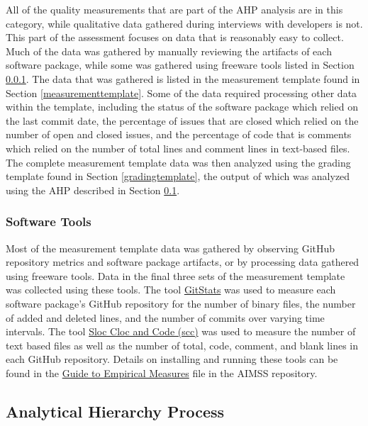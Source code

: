 \documentclass[12pt, notitlepage]{article}
\begin{document}
All of the quality measurements that are part of the AHP analysis are in this category, while qualitative data gathered during interviews with developers is not. This part of the assessment focuses on data that is reasonably easy to collect. Much of the data was gathered by manually reviewing the artifacts of each software package, while some was gathered using freeware tools listed in Section \ref{tools}. The data that was gathered is listed in the measurement template found in Section \ref{measurementtemplate}. Some of the data required processing other data within the template, including the status of the software package which relied on the last commit date, the percentage of issues that are closed which relied on the number of open and closed issues, and the percentage of code that is comments which relied on the number of total lines and comment lines in text-based files. The complete measurement template data was then analyzed using the grading template found in Section \ref{gradingtemplate}, the output of which was analyzed using the AHP described in Section \ref{AHP}.

\subsubsection{Software Tools}\label{tools}

Most of the measurement template data was gathered by observing GitHub repository metrics and software package artifacts, or by processing data gathered using freeware tools. Data in the final three sets of the measurement template was collected using these tools. The tool \href{https://github.com/tomgi/git_stats}{GitStats} was used to measure each software package's GitHub repository for the number of binary files, the number of added and deleted lines, and the number of commits over varying time intervals. The tool \href{https://github.com/boyter/scc}{Sloc Cloc and Code (scc)} was used to measure the number of text based files as well as the number of total, code, comment, and blank lines in each GitHub repository. Details on installing and running these tools can be found in the \href{https://github.com/smiths/AIMSS/blob/master/StateOfPractice/Methodology/A
	Guide to Empirical Measures.pdf} {Guide to Empirical Measures} file in the AIMSS repository. 

\subsection{Analytical Hierarchy Process}\label{AHP}
\end{document}
